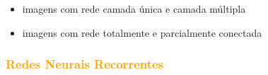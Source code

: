 \documentclass{automatextcc}
\newcommand{\nico}[1]{\textcolor{orange}{#1}}
\begin{document}
\begin{itemize}
    \item imagens com rede camada única e camada múltipla
    \item imagens com rede totalmente e parcialmente conectada
\end{itemize}

\subsubsection{\nico{Redes Neurais Recorrentes}}


\end{document}
